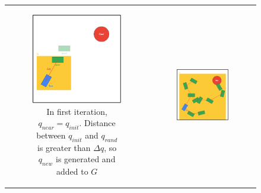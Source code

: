 \begin{figure}[H]
\begin{center}
\begin{tabular}{c c}
    \begin{subfigure}{0.45\textwidth}
    \includegraphics[draft=false,width=\linewidth]{chapters/chapter2/img/RRT_step_by_step-C.png}
    \caption{In first iteration, $q_{near} = q_{init}$. Distance between $q_{init}$ and $q_{rand}$ is greater than $\Delta q$, so $q_{new}$ is generated and added to $G$}
    \label{subfig:rrt-step-by-step-C}
    \end{subfigure} &
    \begin{subfigure}{0.45\textwidth}
    \includegraphics[draft=false,width=\linewidth]{chapters/chapter2/img/RRT_step_by_step-D.png}

\end{subfigure}
\end{tabular}
\end{center}
\end{figure}
